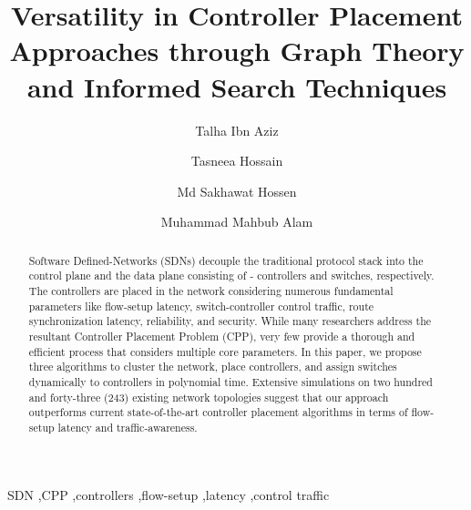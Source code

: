 \documentclass[final,5p,times]{cas-dc}
\begin{document}
	\begin{frontmatter}
		\title{Versatility in Controller Placement Approaches through Graph Theory and Informed Search Techniques}
		
		\author[1]{Talha Ibn Aziz}
		
		\author[1]{Tasneea Hossain}
		
		\author[1]{Md Sakhawat Hossen}
		
		\author[1]{Muhammad Mahbub Alam}
		
		
		\address[1]{Department of Computer Science and Engineering, Islamic University of Technology, Dhaka, Bangladesh}
		
		
		\begin{abstract}
			Software Defined-Networks (SDNs) decouple the traditional protocol stack into the control plane and the data plane consisting of - controllers and switches, respectively. The controllers are placed in the network considering numerous fundamental parameters like flow-setup latency, switch-controller control traffic, route synchronization latency, reliability, and security. While many researchers address the resultant Controller Placement Problem (CPP), very few provide a thorough and efficient process that considers multiple core parameters. In this paper, we propose three algorithms to cluster the network, place controllers, and assign switches dynamically to controllers in polynomial time. Extensive simulations on two hundred and forty-three (243) existing network topologies suggest that our approach outperforms current state-of-the-art controller placement algorithms in terms of flow-setup latency and traffic-awareness.
		\end{abstract}
		\begin{keyword}
			SDN \sep CPP \sep controllers \sep flow-setup \sep latency \sep control traffic
		\end{keyword}
		
	\end{frontmatter}
\end{document}
